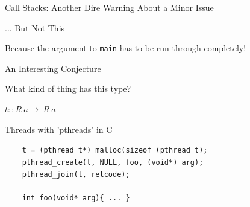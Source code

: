 \documentclass{beamer}
\begin{document}
\begin{frame}{Call Stacks: Another Dire Warning About a Minor Issue}
\begin{structure}{... But Not This}
\begin{center}
\begin{onlinebox}{8cm}
\begin{scriptsize}
\begin{flushleft}
\end{flushleft}
\end{scriptsize}

\end{onlinebox}
\end{center}

\end{structure}
\small{Because the argument to \texttt{main} has to be run through completely!}\\


\end{frame}


\begin{frame}{An Interesting Conjecture}

\begin{large}

\begin{center}
\begin{structure}{What kind of thing has this type?}


$t :: R\ a \rightarrow\ R\ a$

\end{structure}
\end{center}
\end{large}


\pause

\center{\emph{\large{\color{red}{It's a thread!}}}}

\medskip

\begin{structure}{Threads with 'pthreads' in C}

\begin{onlinebox}{10cm}

\begin{small}
\begin{flushleft}

\texttt{\ \ \ \ t = (pthread\_t*) malloc(sizeof (pthread\_t);}\\
\texttt{\ \ \ \ pthread\_create(t, NULL, foo, (void*) arg);}\\
\texttt{\ \ \ \ pthread\_join(t, retcode);}\\
\ \\
\texttt{\ \ \ \ int foo(void* arg)\{ ... \}}\\

\end{flushleft}
\end{small}


\end{onlinebox}
\end{structure}
\end{frame}
\end{document}
